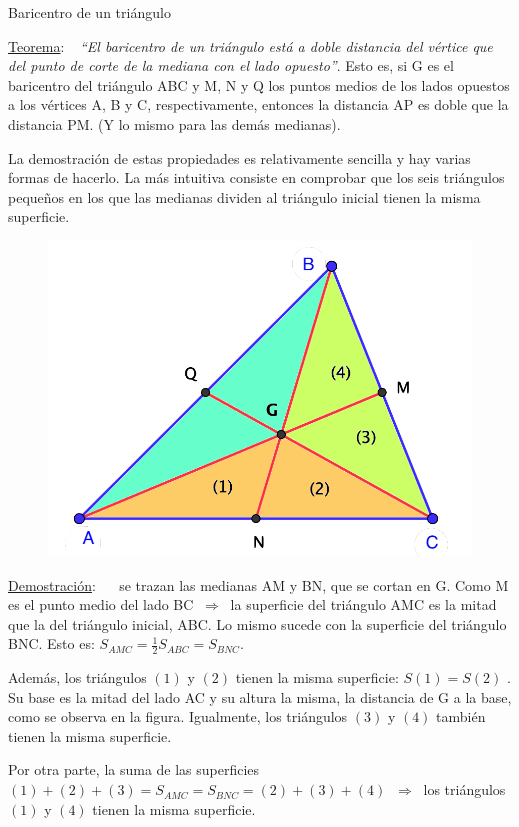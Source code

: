 \vspace{5mm}
\begin{myexampleblock}{Baricentro de un triángulo}

\vspace{2mm} \underline{Teorema}: $\ \ $ \emph{``El baricentro de un triángulo está a doble distancia del vértice que del punto de corte de la mediana con el lado opuesto''}. Esto es, si G es el baricentro del triángulo ABC y M, N y Q los puntos medios de los lados opuestos a los vértices A, B y C, respectivamente, entonces la distancia AP es doble que la distancia PM. (Y lo mismo para las demás medianas).
	
\begin{multicols}{2}	
\vspace{2mm} La demostración de estas propiedades es relativamente sencilla y hay varias formas de hacerlo. La más intuitiva consiste en comprobar que los seis triángulos pequeños en los que las medianas dividen al triángulo inicial tienen la misma superficie.

\begin{figure}[H]
	\centering
	\includegraphics[width=.35\textwidth]{img-ga/ga26.png}
\end{figure}
\end{multicols}

\begin{small}  %
\underline{Demostración}: $\quad$ se trazan las medianas AM y BN, que se cortan en G.
Como M es el punto medio del lado BC $\ \Rightarrow \ $ la superficie del triángulo AMC es la mitad que la del triángulo inicial, ABC. Lo mismo sucede con la superficie del triángulo BNC. Esto es: $S_{ A M C} = \frac 12 S_{A B C}= S_{ B N C}$.

\vspace{2mm} Además, los triángulos $(1)$ y $(2)$ tienen la misma superficie:
$S(1) = S(2)$ . Su base es la mitad del lado AC y su altura la misma, la
distancia de G a la base, como se observa en la figura. Igualmente, los triángulos $(3)$ y $(4)$ también tienen la misma superficie. 

\vspace{2mm} Por otra parte, la suma de las superficies $(1)+(2)+(3)= S_{AMC} =S_{BNC} =(2)+(3)+(4)$ $\ \Rightarrow \ $ los triángulos $(1)$ y $(4)$ tienen la misma superficie.


\end{small}
\end{myexampleblock}
